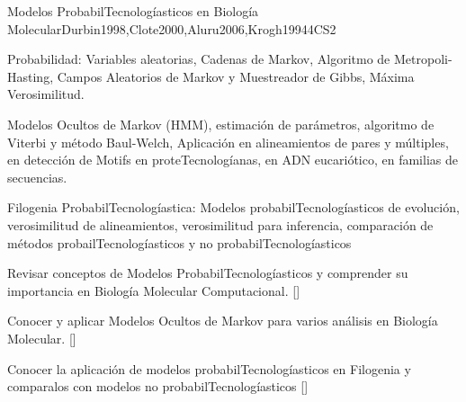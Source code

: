 \begin{syllabus}
\begin{unit}{Modelos ProbabilTecnologíasticos en Biología Molecular}{}{Durbin1998,Clote2000,Aluru2006,Krogh1994}{4}{CS2}
   \begin{topics}
    \item Probabilidad: Variables aleatorias, Cadenas de Markov, Algoritmo de Metropoli-Hasting, Campos Aleatorios de Markov y Muestreador de Gibbs, Máxima Verosimilitud.
    \item Modelos Ocultos de Markov (HMM), estimación de parámetros, algoritmo de Viterbi y método Baul-Welch, Aplicación en alineamientos de pares y múltiples, en detección de Motifs en proteTecnologíanas, en ADN eucariótico, en familias de secuencias.
		\item Filogenia ProbabilTecnologíastica: Modelos probabilTecnologíasticos de evolución, verosimilitud de alineamientos, verosimilitud para inferencia, comparación de métodos probailTecnologíasticos y no probabilTecnologíasticos
   \end{topics}
   \begin{learningoutcomes}
      \item  Revisar conceptos de Modelos ProbabilTecnologíasticos y comprender su importancia en Biología Molecular Computacional. [\Assessment]
	  \item Conocer y aplicar Modelos Ocultos de Markov para varios análisis en Biología Molecular. [\Usage]
		\item Conocer la aplicación de modelos probabilTecnologíasticos en Filogenia y comparalos con modelos no probabilTecnologíasticos [\Assessment]
   \end{learningoutcomes}
\end{unit}

\begin{coursebibliography}
\end{coursebibliography}

\end{syllabus}
